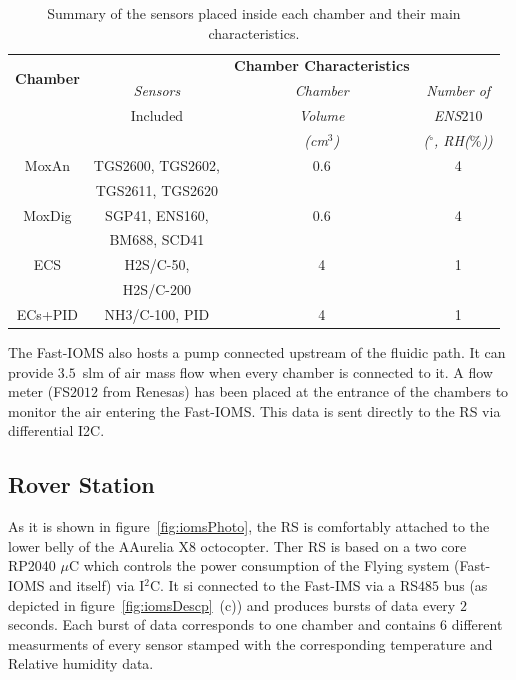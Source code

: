 \documentclass[lettersize,journal]{IEEEtran}
\begin{document}
\begin{table}
	\caption{Summary of the sensors placed inside each chamber and their main characteristics.}
	\setlength{\tabcolsep}{0.5\tabcolsep}%
	\centering
	\begin{tabular}{ *{4}{c} }
	\toprule
	\multirow{2}{*}{\textbf{Chamber}} & & \textbf{Chamber Characteristics}\\
		& \textit{Sensors} & \textit{Chamber} & \textit{Number of}\\
		& {Included} & \textit{Volume} & \textit{ENS$210$}\\
		& &\textit{(cm$^{3}$)} & \textit{($^{\circ}$, RH($\%$))}\\
		\midrule
		MoxAn & TGS2600, TGS2602,   & 0.6    & 4\\
		    & TGS2611, TGS2620	  &        &  \\
		MoxDig & SGP41, ENS160, & 0.6    & 4\\
		     & BM688, SCD41	  &        &  \\
		ECS & H2S/C-50, & 4 & 1\\
		  & H2S/C-200 & & \\
		ECs+PID & NH3/C-100, PID & 4 & 1\\
		\bottomrule
	\end{tabular}
	\label{tab:fastIOMSsensors}
\end{table}
 
 
The Fast-IOMS also hosts a pump connected upstream of the fluidic path. It can provide $3.5$~slm of air mass flow when every chamber is connected to it. A flow meter (FS$2012$ from Renesas) has been placed at the entrance of the chambers to monitor the air entering the Fast-IOMS. This data is sent directly to the RS via differential I2C.

\subsection{Rover Station}
\label{ssec:roverStation}

As it is shown in figure~\ref{fig:iomsPhoto}, the RS is comfortably attached to the lower belly of the AAurelia X8 octocopter. Ther RS is based on a two core RP2040 $\mu$C which controls the power consumption of the Flying system (Fast-IOMS and itself) via I$^{2}$C. It si connected to the Fast-IMS via a RS$485$ bus (as depicted in figure~\ref{fig:iomsDescp}~(c)) and produces bursts of data every $2$ seconds. Each burst of data corresponds to one chamber and contains $6$ different measurments of every sensor stamped with the corresponding temperature and Relative humidity data.
\end{document}
